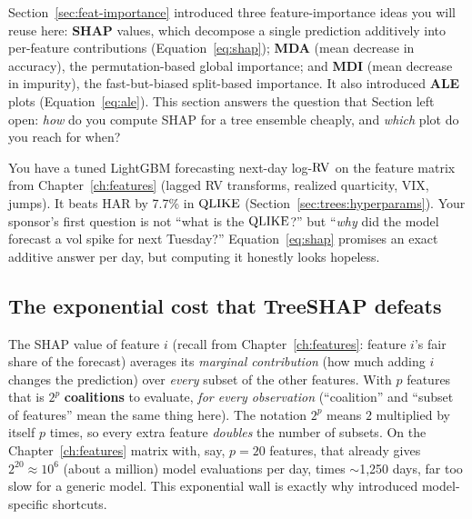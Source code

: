 \begin{prereq}
Section~\ref{sec:feat-importance} introduced three feature-importance ideas
you will reuse here: \textbf{SHAP} values, which decompose a single
prediction additively into per-feature contributions
(Equation~\ref{eq:shap}); \textbf{MDA} (mean decrease in accuracy), the
permutation-based global importance; and \textbf{MDI} (mean decrease in
impurity), the fast-but-biased split-based importance.  It also introduced
\textbf{ALE} plots (Equation~\ref{eq:ale}).  This section answers the
question that Section left open: \emph{how} do you compute SHAP for a tree
ensemble cheaply, and \emph{which} plot do you reach for when?
\end{prereq}

You have a tuned LightGBM forecasting next-day log-$\operatorname{RV}$ on the feature
matrix from Chapter~\ref{ch:features} (lagged RV transforms, realized
quarticity, VIX, jumps).  It beats HAR by 7.7\% in $\operatorname{QLIKE}$
(Section~\ref{sec:trees:hyperparams}).  Your sponsor's first question is not
``what is the $\operatorname{QLIKE}$?'' but ``\emph{why} did the model forecast a vol spike
for next Tuesday?''  Equation~\ref{eq:shap} promises an exact additive answer
per day, but computing it honestly looks hopeless.

\subsection{The exponential cost that TreeSHAP defeats}

The SHAP value of feature $i$ (recall from Chapter~\ref{ch:features}: feature
$i$'s fair share of the forecast) averages its \emph{marginal contribution}
(how much adding $i$ changes the prediction) over \emph{every} subset of the
other features.  With $p$ features that is $2^p$ \textbf{coalitions} to
evaluate, \emph{for every observation} (``coalition'' and ``subset of
features'' mean the same thing here).  The notation $2^p$ means $2$
multiplied by itself $p$ times, so every extra feature \emph{doubles} the
number of subsets.  On the Chapter~\ref{ch:features} matrix with, say,
$p = 20$ features, that already gives $2^{20} \approx 10^6$ (about a million)
model evaluations per day, times $\sim$1{,}250 days,
far too slow for a generic model.  This exponential wall is exactly why
\citet{Lundberg2017} introduced model-specific shortcuts.

